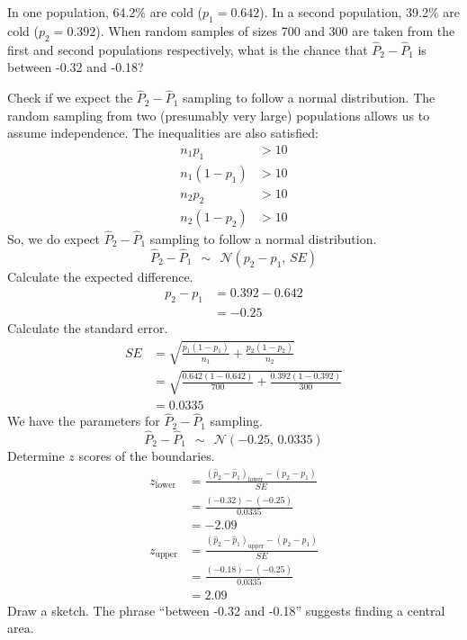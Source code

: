 
\begin{question}
In one population, 64.2\% are cold (\(p_1 = 0.642\)). In a second
population, 39.2\% are cold (\(p_2 = 0.392\)). When random samples of
sizes 700 and 300 are taken from the first and second populations
respectively, what is the chance that \(\hat{P}_2 - \hat{P}_1\) is
between -0.32 and -0.18?
\end{question}

\begin{solution}
Check if we expect the \(\hat{P}_2 - \hat{P}_1\) sampling to follow a
normal distribution. The random sampling from two (presumably very
large) populations allows us to assume independence. The inequalities
are also satisfied: \[
\begin{aligned}
n_1 p_1 &> 10 \\
n_1 (1-p_1) &> 10\\
n_2 p_2 &> 10 \\
n_2 (1 -p_2) &> 10
\end{aligned}
\] So, we do expect \(\hat{P}_2 - \hat{P}_1\) sampling to follow a
normal distribution.
\[\hat{P}_2 - \hat{P}_1 ~~\sim~~ \mathcal{N}(p_2-p_1,\,SE)\] Calculate
the expected difference. \[
\begin{aligned}
p_2-p_1 &= 0.392-0.642\\
   &= -0.25
\end{aligned}
\] Calculate the standard error. \[
\begin{aligned}
SE &= \sqrt{\frac{p_1(1-p_1)}{n_1}+\frac{p_2(1-p_2)}{n_2}}\\[1em]
   &= \sqrt{\frac{0.642(1-0.642)}{700}+\frac{0.392(1-0.392)}{300}}\\[1em]
   &= 0.0335
\end{aligned}
\] We have the parameters for \(\hat{P}_2 - \hat{P}_1\) sampling.
\[\hat{P}_2 - \hat{P}_1 ~~\sim~~ \mathcal{N}(-0.25,\,0.0335)\] Determine
\(z\) scores of the boundaries. \[
\begin{aligned}
z_\text{lower}  &= \frac{(\hat{p}_2-\hat{p}_1)_\text{lower}-(p_2-p_1)}{SE} \\[1em]
   &= \frac{(-0.32) - (-0.25)}{0.0335} \\[1em]
   &= -2.09\\[1em]
z_\text{upper}  &= \frac{(\hat{p}_2-\hat{p}_1)_\text{upper}-(p_2-p_1)}{SE} \\[1em]
   &= \frac{(-0.18) - (-0.25)}{0.0335} \\[1em]
   &= 2.09
\end{aligned}
\] Draw a sketch. The phrase ``between -0.32 and -0.18'' suggests
finding a central area.


\end{solution}
